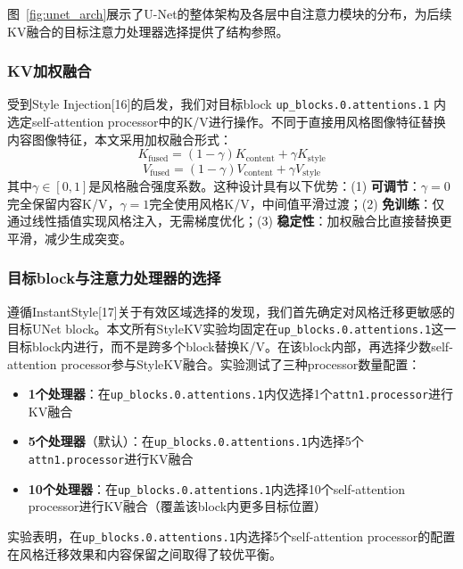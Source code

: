 \documentclass[10pt,twocolumn]{article}
\begin{document}
图~\ref{fig:unet_arch}展示了U-Net的整体架构及各层中自注意力模块的分布，为后续KV融合的目标注意力处理器选择提供了结构参照。

\subsubsection{KV加权融合}

受到Style Injection[16]的启发，我们对目标block \texttt{up\_blocks.0.attentions.1} 内选定self-attention processor中的K/V进行操作。不同于直接用风格图像特征替换内容图像特征，本文采用加权融合形式：
\begin{equation}
K_{\text{fused}} = (1 - \gamma) K_{\text{content}} + \gamma K_{\text{style}} \label{eq:kfusion}
\end{equation}
\begin{equation}
V_{\text{fused}} = (1 - \gamma) V_{\text{content}} + \gamma V_{\text{style}} \label{eq:vfusion}
\end{equation}
其中$\gamma \in [0, 1]$是风格融合强度系数。这种设计具有以下优势：(1) {\bfseries 可调节}：$\gamma=0$完全保留内容K/V，$\gamma=1$完全使用风格K/V，中间值平滑过渡；(2) {\bfseries 免训练}：仅通过线性插值实现风格注入，无需梯度优化；(3) {\bfseries 稳定性}：加权融合比直接替换更平滑，减少生成突变。

\subsubsection{目标block与注意力处理器的选择}

遵循InstantStyle[17]关于有效区域选择的发现，我们首先确定对风格迁移更敏感的目标UNet block。本文所有StyleKV实验均固定在\texttt{up\_blocks.0.attentions.1}这一目标block内进行，而不是跨多个block替换K/V。在该block内部，再选择少数self-attention processor参与StyleKV融合。实验测试了三种processor数量配置：
\begin{itemize}
  \setlength{\itemsep}{0pt}
\item {\bfseries 1个处理器}：在\texttt{up\_blocks.0.attentions.1}内仅选择1个\texttt{attn1.processor}进行KV融合
\item {\bfseries 5个处理器}（默认）：在\texttt{up\_blocks.0.attentions.1}内选择5个\texttt{attn1.processor}进行KV融合
\item {\bfseries 10个处理器}：在\texttt{up\_blocks.0.attentions.1}内选择10个self-attention processor进行KV融合（覆盖该block内更多目标位置）
\end{itemize}
实验表明，在\texttt{up\_blocks.0.attentions.1}内选择5个self-attention processor的配置在风格迁移效果和内容保留之间取得了较优平衡。
\end{document}
